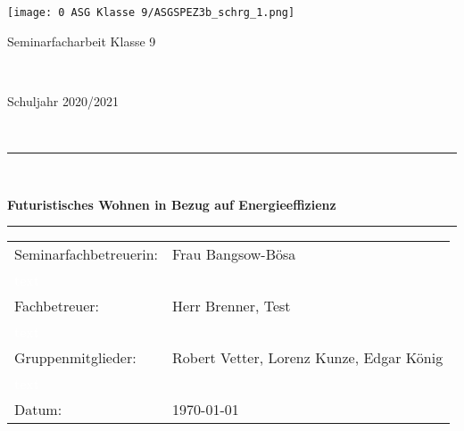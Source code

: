 \vspace{1cm}

\texttt{[image: 0 ASG Klasse 9/ASGSPEZ3b\_schrg\_1.png]}
\
\begin{center}
\vspace{1cm}
\Large{Seminarfacharbeit Klasse 9}
\end{center}
\
\begin{center}
\Large{Schuljahr 2020/2021}
\vspace{1cm}
\end{center}
\
\hrule
\vspace{0.2cm}
\
\begin{center}
\Huge\textbf{Futuristisches Wohnen in Bezug auf Energieeffizienz}
\vspace{0.2cm}
\end{center}
\hrule
\normalsize
\vspace{0.2cm}
\vspace{1cm}

\large{

\begin{tabular}{ll}

Seminarfachbetreuerin: & Frau Bangsow-Bösa \\
\textcolor{white}{text} \\
\par
Fachbetreuer: & Herr Brenner, Test \\
\textcolor{white}{text} \\
\par
Gruppenmitglieder: & Robert Vetter, Lorenz Kunze, Edgar König \\
\textcolor{white}{text} \\
\par
Datum: & \today \\

\end{tabular}
}

\normalsize

\newpage
\setcounter{page}{1}
\tableofcontents
\newpage
